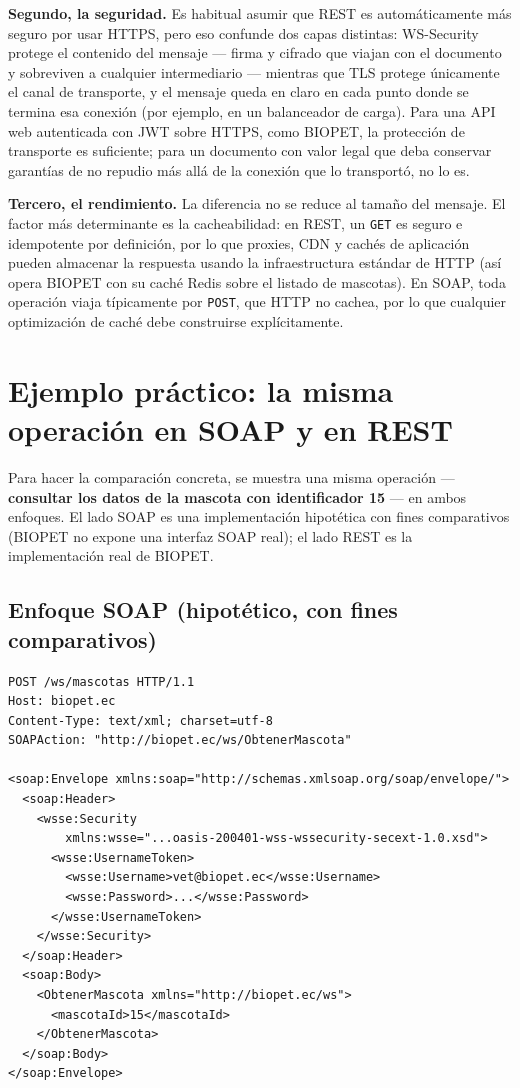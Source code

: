 \textbf{Segundo, la seguridad.} Es habitual asumir que REST es
autom\'aticamente m\'as seguro por usar HTTPS, pero eso confunde dos capas
distintas: WS-Security protege el contenido del mensaje --- firma y cifrado
que viajan con el documento y sobreviven a cualquier intermediario ---
mientras que TLS protege \'unicamente el canal de transporte, y el mensaje
queda en claro en cada punto donde se termina esa conexi\'on (por ejemplo,
en un balanceador de carga). Para una API web autenticada con JWT sobre
HTTPS, como BIOPET, la protecci\'on de transporte es suficiente; para un
documento con valor legal que deba conservar garantías de no repudio m\'as
all\'a de la conexi\'on que lo transport\'o, no lo es.

\textbf{Tercero, el rendimiento.} La diferencia no se reduce al tama\~no del
mensaje. El factor m\'as determinante es la cacheabilidad: en REST, un
\texttt{GET} es seguro e idempotente por definici\'on, por lo que proxies,
CDN y cach\'es de aplicaci\'on pueden almacenar la respuesta usando la
infraestructura est\'andar de HTTP (as\'i opera BIOPET con su cach\'e Redis
sobre el listado de mascotas). En SOAP, toda operaci\'on viaja t\'ipicamente
por \texttt{POST}, que HTTP no cachea, por lo que cualquier optimizaci\'on
de cach\'e debe construirse expl\'icitamente.

\section{Ejemplo pr\'actico: la misma operaci\'on en SOAP y en REST}
\label{sec:soap-rest-ejemplo}

Para hacer la comparaci\'on concreta, se muestra una misma operaci\'on ---
\textbf{consultar los datos de la mascota con identificador 15} --- en
ambos enfoques. El lado SOAP es una implementaci\'on hipot\'etica con fines
comparativos (BIOPET no expone una interfaz SOAP real); el lado REST es la
implementaci\'on real de BIOPET.

\subsection{Enfoque SOAP (hipot\'etico, con fines comparativos)}

\begin{verbatim}
POST /ws/mascotas HTTP/1.1
Host: biopet.ec
Content-Type: text/xml; charset=utf-8
SOAPAction: "http://biopet.ec/ws/ObtenerMascota"

<soap:Envelope xmlns:soap="http://schemas.xmlsoap.org/soap/envelope/">
  <soap:Header>
    <wsse:Security
        xmlns:wsse="...oasis-200401-wss-wssecurity-secext-1.0.xsd">
      <wsse:UsernameToken>
        <wsse:Username>vet@biopet.ec</wsse:Username>
        <wsse:Password>...</wsse:Password>
      </wsse:UsernameToken>
    </wsse:Security>
  </soap:Header>
  <soap:Body>
    <ObtenerMascota xmlns="http://biopet.ec/ws">
      <mascotaId>15</mascotaId>
    </ObtenerMascota>
  </soap:Body>
</soap:Envelope>
\end{verbatim}

